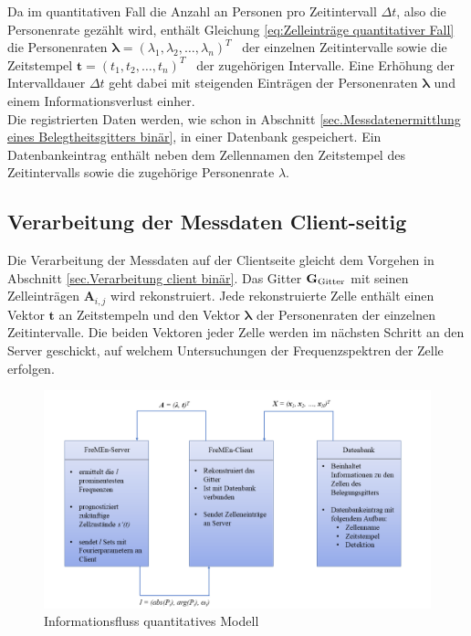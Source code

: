 Da im quantitativen Fall die Anzahl an Personen pro Zeitintervall $\Delta t$, also die Personenrate gezählt wird, enthält Gleichung \ref{eq:Zelleinträge quantitativer Fall} die Personenraten $\boldsymbol{\lambda} = (\lambda_1, \lambda_2, \dots , \lambda_n)^T$ \, der einzelnen Zeitintervalle sowie die Zeitstempel $\boldsymbol{t} = (t_1, t_2, \dots , t_n)^T$ \, der zugehörigen Intervalle. Eine Erhöhung der Intervalldauer $\Delta t$ geht dabei mit steigenden Einträgen der Personenraten $\boldsymbol{\lambda}$ und einem Informationsverlust einher. \\
Die registrierten Daten werden, wie schon in Abschnitt \ref{sec.Messdatenermittlung eines Belegtheitsgitters binär}, in einer Datenbank gespeichert. Ein Datenbankeintrag enthält neben dem Zellennamen den Zeitstempel des Zeitintervalls sowie die zugehörige Personenrate $\lambda$.

\subsection{Verarbeitung der Messdaten Client-seitig}
\label{sec.Messdatenverarbeitung client quantitativ}

Die Verarbeitung der Messdaten auf der Clientseite gleicht dem Vorgehen in Abschnitt \ref{sec.Verarbeitung client binär}. Das Gitter $\mathbf{G}_{\mathrm{Gitter}}$ mit seinen Zelleinträgen $\boldsymbol{A}_{i,j}$ wird rekonstruiert. Jede rekonstruierte Zelle enthält einen Vektor $\boldsymbol{t}$ an Zeitstempeln und den Vektor $\boldsymbol{\lambda}$ der Personenraten der einzelnen Zeitintervalle. Die beiden Vektoren jeder Zelle werden im nächsten Schritt an den Server geschickt, auf welchem Untersuchungen der Frequenzspektren der Zelle erfolgen.

\begin{figure}[!h]
	\begin{center}
		\centering
		\includegraphics[width=1.0\linewidth]{Abbildungen/methodik/Ablauf_quantitativ}
		\caption[Informationsfluss quantitatives Modell]{Informationsfluss quantitatives Modell}
		\label{fig.Informationsfluss_quantitatives_Modell}
	\end{center}
\end{figure}

